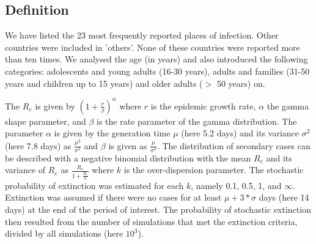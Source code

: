 \documentclass[10pt, a4paper, twoside]{article}
\begin{document}
\begin{multicols}{2}
\subsection{Definition}
We have listed the 23 most frequently reported places of infection. Other countries were included in 'others'. None of these countries were reported more than ten times.
We analysed the age (in years) and also introduced the following categories: adolescents and young adults (16-30 years), adults and families (31-50 years and children up to 15 years) and older adults ($>$ 50 years) on.


The $R_e$ is given by $(1 + \frac{r}{\beta} )^\alpha$ where $r$ is the epidemic growth rate, $\alpha$ the gamma shape parameter, and $\beta$ is the rate parameter of the gamma distribution. 
The parameter $\alpha$ is given by the generation time $\mu$ (here 5.2 days) and its variance $\sigma^2$ (here 7.8 days) as $\frac{\mu^2}{\sigma^2 }$ and $\beta$ is given as $\frac{\mu}{\sigma^2}$. 
The distribution of secondary cases can be described with a negative binomial distribution with the mean $R_e$ and its variance of $R_e$ as $\frac{R_e}{1+\frac{R_e}{k}}$ where $k$ is the over-dispersion parameter. 
The stochastic probability of extinction was estimated for each $k$, namely 0.1, 0.5, 1, and  $\infty$. 
Extinction was assumed if there were no cases for at least $\mu + 3*\sigma$ days (here 14 days) at the end of the period of interest.
The probability of stochastic extinction then resulted from the number of simulations that met the extinction criteria, divided by all simulations (here $10^3$).


\end{multicols}
\end{document}
